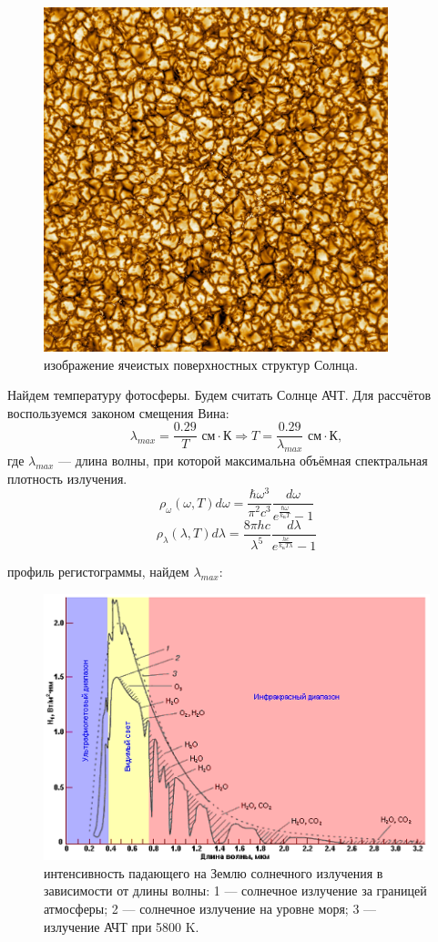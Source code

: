 \documentclass[a4paper,12pt]{article}
\begin{document}
\begin{figure}[H]
		\centering
		\includegraphics[width=100mm]{Images/Highest_resolution_photo_of_Sun_(NSF)_as_of_January_20,_2020.jpg}
        \caption{изображение ячеистых поверхностных структур Солнца.}
\end{figure}

Найдем температуру фотосферы. 
Будем считать Солнце АЧТ. Для рассчётов воспользуемся законом смещения Вина: 
\[
\lambda_{max} = \frac{0.29 }{T } \text{ см} \cdot \text{К}\Rightarrow T = \frac{0.29}{\lambda_{max}} \text{ см} \cdot \text{К},
\]
где $\lambda_{max}$ --- длина волны, при которой максимальна 
объёмная спектральная плотность излучения.  
\[
\rho_{\omega}(\omega, T)d\omega = \frac{\hbar \omega^{3}}{\pi^2 
c^3} \frac{d\omega}{e^{\frac{\hbar\omega}{k_{\text{Б}}T}} - 1} 
\]
\[
\rho_{\lambda}(\lambda, T)d\lambda = \frac{8\pi h c}{\lambda^5} \frac{d\lambda}{e^{\frac{h c}{k_{\text{Б}}T \lambda}} - 1}
\]

\newpage
{} профиль регистограммы, найдем $\lambda_{max}$: 
\begin{figure}[H]
		\centering
		\includegraphics[width=170mm]{Images/Intensivity_.png}
        \caption{интенсивность падающего на Землю солнечного излучения в зависимости от длины волны: 1 --- солнечное излучение за границей атмосферы; 2 --- солнечное излучение на уровне моря; 3 --- излучение АЧТ при 5800 K.}
        
\end{figure}
\end{document}
